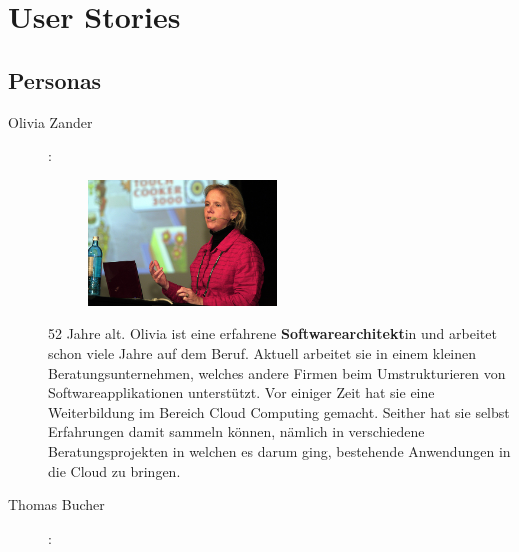 \section{User Stories}
	\subsection{Personas}
		\begin{description}
			\item[Olivia Zander]\label{olivia}:\newline
				\begin{minipage}[t]{0.35\textwidth} 
					\begin{figure}[H]
						\vspace{-0.75cm}
						\includegraphics[trim=0cm 0cm 0cm 0cm, clip=true, width=5cm]{requirements/media/img/oliviaZander.jpg}
						\caption[Symbolbild Persona Olivia Zander\newline 
						]
						{\label{Olivia Zander}}
					\end{figure}
				\end{minipage}
				\begin{minipage}[t]{0.55\textwidth}
					52 Jahre alt.
					Olivia ist eine erfahrene \textbf{Softwarearchitekt}in und arbeitet schon viele Jahre auf dem Beruf.
					Aktuell arbeitet sie in einem kleinen Beratungsunternehmen, welches andere Firmen beim Umstrukturieren von Softwareapplikationen unterstützt.
					Vor einiger Zeit hat sie eine Weiterbildung im Bereich Cloud Computing gemacht.
					Seither hat sie selbst Erfahrungen damit sammeln können, nämlich in verschiedene Beratungsprojekten in welchen es darum ging, bestehende Anwendungen in die Cloud zu bringen.
				\end{minipage}
			\item[Thomas Bucher]\label{thomas}:\newline
				\begin{minipage}[t]{0.35\textwidth} 
					\begin{figure}[H]
						\vspace{-0.75cm}

\end{figure}
\end{minipage}
\end{description}

